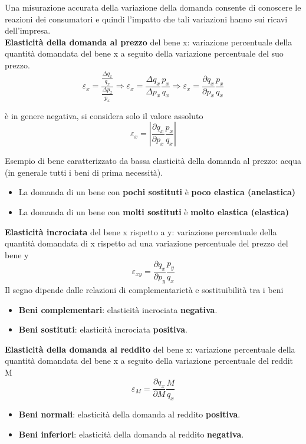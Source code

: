 \documentclass[../main.tex]{subfiles}
\begin{document}
Una misurazione accurata della variazione della domanda consente di conoscere le reazioni dei consumatori e quindi l'impatto che tali variazioni hanno sui ricavi dell'impresa.\\

\textbf{Elasticità della domanda al prezzo} del bene x: variazione percentuale della quantità domandata del bene x a seguito della variazione percentuale del suo prezzo.
$$
\varepsilon_x=\frac{\frac{\Delta q_x}{q_x}}{\frac{\Delta p_x}{p_x}}\Rightarrow\varepsilon_x=\frac{\Delta q_x}{\Delta p_x}\frac{p_x}{q_x}\Rightarrow\varepsilon_x=\frac{\partial q_x}{\partial p_x}\frac{p_x}{q_x}
$$

è in genere negativa, si considera solo il valore assoluto
$$
\varepsilon_x = |\frac{\partial q_x}{\partial p_x}\frac{p_x}{q_x}|
$$

Esempio di bene caratterizzato da bassa elasticità della domanda al prezzo: acqua (in generale tutti i beni di prima necessità).

\begin{itemize}
\item La domanda di un bene con \textbf{pochi sostituti} è \textbf{poco elastica (anelastica)}
\item La domanda di un bene con \textbf{molti sostituti} è \textbf{molto elastica (elastica)}\\
\end{itemize}

\textbf{Elasticità incrociata} del bene x rispetto a y: variazione percentuale della quantità domandata di x rispetto ad una variazione percentuale del prezzo del bene y
$$\varepsilon_{xy}=\frac{\partial q_x}{\partial p_y}\frac{p_y}{q_x}$$
Il segno dipende dalle relazioni di complementarietà e sostituibilità tra i beni
\begin{itemize}
\item \textbf{Beni complementari}: elasticità incrociata \textbf{negativa}.
\item \textbf{Beni sostituti}: elasticità incrociata \textbf{positiva}.\\
\end{itemize}

\textbf{Elasticità della domanda al reddito} del bene x: variazione percentuale della quantità domandata del bene x a seguito della variazione percentuale del reddit M
$$\varepsilon_M=\frac{\partial q_x}{\partial M} \frac{M}{q_x}$$

\begin{itemize}
\item \textbf{Beni normali}: elasticità della domanda al reddito \textbf{positiva}.
\item \textbf{Beni inferiori}: elasticità della domanda al reddito \textbf{negativa}.
\end{itemize}
\end{document}
